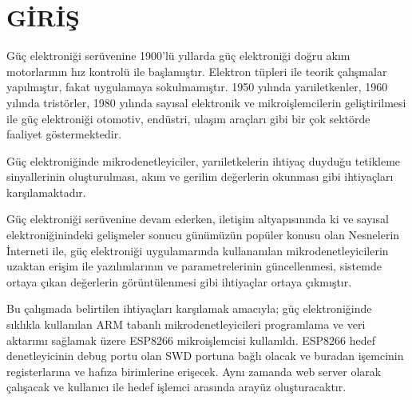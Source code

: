 \chapter{GİRİŞ}

Güç elektroniği serüvenine 1900'lü yıllarda güç elektroniği doğru akım motorlarının hız kontrolü ile başlamıştır.
Elektron tüpleri ile teorik çalışmalar yapılmıştır, fakat uygulamaya sokulmamıştır.
1950 yılında yarıiletkenler, 1960 yılında tristörler, 1980 yılında sayısal elektronik ve
mikroişlemcilerin geliştirilmesi ile güç elektroniği otomotiv, endüstri, ulaşım araçları gibi bir çok sektörde faaliyet
göstermektedir.

Güç elektroniğinde mikrodenetleyiciler, yarıiletkelerin ihtiyaç duyduğu tetikleme sinyallerinin oluşturulması,
akım ve gerilim değerlerin okunması gibi ihtiyaçları karşılamaktadır.

Güç elektroniği serüvenine devam ederken, iletişim altyapısınında ki ve sayısal elektroniğinindeki gelişmeler sonucu günümüzün popüler konusu olan Nesnelerin İnterneti ile,
güç elektroniği uygulamarında kullananılan mikrodenetleyicilerin uzaktan erişim ile yazılımlarının ve parametrelerinin
güncellenmesi, sistemde ortaya çıkan değerlerin görüntülenmesi gibi ihtiyaçlar ortaya çıkmıştır.

Bu çalışmada belirtilen ihtiyaçları karşılamak amacıyla; güç elektroniğinde sıklıkla kullanılan ARM tabanlı mikrodenetleyicileri programlama ve veri aktarımı sağlamak üzere ESP8266 mikroişlemcisi kullanıldı.
ESP8266 hedef denetleyicinin debug portu olan \acrfull{SWD} portuna bağlı olacak ve buradan işemcinin
registerlarına ve hafıza birimlerine erişecek. Aynı zamanda web server olarak çalışacak ve kullanıcı ile hedef
işlemci arasında arayüz oluşturacaktır.



